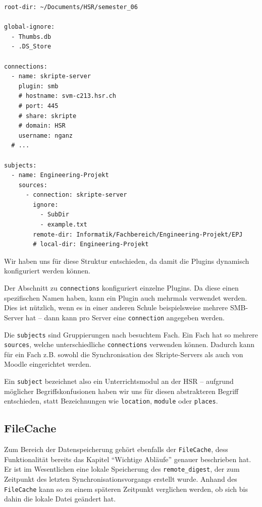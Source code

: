 \documentclass[a4paper]{article}
\begin{document}
\begin{verbatim}
root-dir: ~/Documents/HSR/semester_06

global-ignore:
  - Thumbs.db
  - .DS_Store

connections:
  - name: skripte-server
    plugin: smb
    # hostname: svm-c213.hsr.ch
    # port: 445
    # share: skripte
    # domain: HSR
    username: nganz
  # ...

subjects:
  - name: Engineering-Projekt
    sources:
      - connection: skripte-server
        ignore:
          - SubDir
          - example.txt
        remote-dir: Informatik/Fachbereich/Engineering-Projekt/EPJ
        # local-dir: Engineering-Projekt
\end{verbatim}

Wir haben uns für diese Struktur entschieden, da damit die Plugins dynamisch konfiguriert werden können.

Der Abschnitt zu \verb|connections| konfiguriert einzelne Plugins.
Da diese einen spezifischen Namen haben, kann ein Plugin auch mehrmals verwendet werden.
Dies ist nützlich, wenn es in einer anderen Schule beispielsweise mehrere
SMB-Server hat -- dann kann pro Server eine \verb|connection| angegeben werden.

Die \verb|subjects| sind Gruppierungen nach besuchtem Fach.
Ein Fach hat so mehrere \verb|sources|, welche unterschiedliche \verb|connections| verwenden können.
Dadurch kann für ein Fach z.B. sowohl die Synchronisation des Skripte-Servers als auch von Moodle eingerichtet werden.

Ein \verb|subject| bezeichnet also ein Unterrichtsmodul an der HSR -- aufgrund möglicher Begriffskonfusionen haben wir uns für diesen abstrakteren Begriff entschieden, statt Bezeichnungen wie \verb|location|, \verb|module| oder \verb|places|.

\pagebreak

\subsection{FileCache}

Zum Bereich der Datenspeicherung gehört ebenfalls der \verb|FileCache|, dess Funktionalität bereits das Kapitel ``Wichtige Abläufe'' genauer beschrieben hat. Er ist im Wesentlichen eine lokale Speicherung des \verb|remote_digest|, der zum Zeitpunkt des letzten Synchronisationsvorgangs erstellt wurde. Anhand des \verb|FileCache| kann so zu einem späteren Zeitpunkt verglichen werden, ob sich bis dahin die lokale Datei geändert hat.
\end{document}
